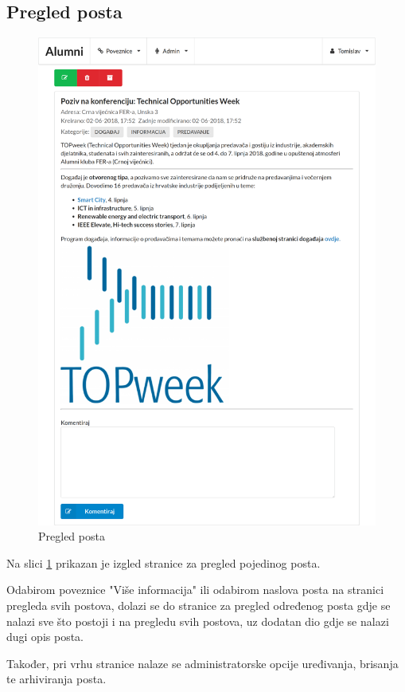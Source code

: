 \documentclass[zavrsni, numeric]{fer}
\begin{document}
\subsection{Pregled posta}

\begin{figure}[H]
	\centering
	\includegraphics[width=13cm]{slike/post.png}
	\caption{Pregled posta}
	\label{fig:post}
\end{figure}

Na slici \ref{fig:post} prikazan je izgled stranice za pregled pojedinog posta.

Odabirom poveznice "Više informacija" ili odabirom naslova posta na stranici pregleda svih postova, dolazi se do stranice za pregled određenog posta gdje se nalazi sve što postoji i na pregledu svih postova, uz dodatan dio gdje se nalazi dugi opis posta.

Također, pri vrhu stranice nalaze se administratorske opcije uređivanja, brisanja te arhiviranja posta.
 
\end{document}
